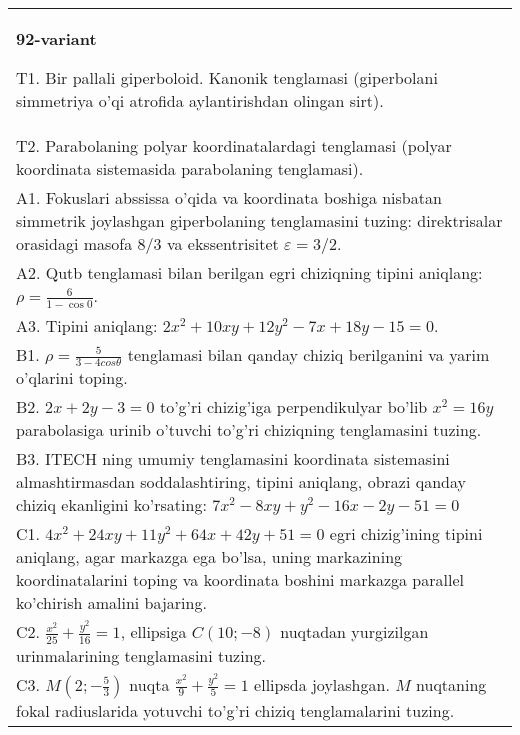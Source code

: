 \documentclass{article}
\begin{document}
\begin{tabular}{m{17cm}}
\textbf{92-variant}
\newline

T1. Bir pallali giperboloid. Kanonik tenglamasi (giperbolani simmetriya o'qi atrofida aylantirishdan olingan sirt).\\

T2. Parabolaning polyar koordinatalardagi tenglamasi (polyar koordinata sistemasida parabolaning tenglamasi).\\

A1. Fokuslari abssissa o'qida va koordinata boshiga nisbatan simmetrik joylashgan giperbolaning tenglamasini tuzing: direktrisalar orasidagi masofa $8/3$ va ekssentrisitet $\varepsilon=3/2$.\\

A2. Qutb tenglamasi bilan berilgan egri chiziqning tipini aniqlang: $\rho=\frac{6}{1-\cos 0}$.\\

A3. Tipini aniqlang: $2x^{2}+10xy+12y^{2}-7x+18y-15=0$.\\

B1. $\rho = \frac{5}{3 - 4cos\theta}$ tenglamasi bilan qanday chiziq berilganini va yarim o'qlarini toping.  \\

B2. $2x + 2y - 3 = 0$ to'g'ri chizig'iga perpendikulyar bo'lib $x^{2} = 16y$ parabolasiga urinib o'tuvchi to'g'ri chiziqning tenglamasini tuzing.  \\

B3. ITECH ning umumiy tenglamasini koordinata sistemasini almashtirmasdan soddalashtiring, tipini aniqlang, obrazi qanday chiziq ekanligini ko'rsating: $7x^{2} - 8xy + y^{2} - 16x - 2y - 51 = 0$\\

C1. $4x^{2} + 24xy + 11y^{2} + 64x + 42y + 51 = 0$ egri chizig'ining tipini aniqlang, agar markazga ega bo'lsa, uning markazining koordinatalarini toping va koordinata boshini markazga parallel ko'chirish amalini bajaring.\\

C2. $\frac{x^{2}}{25} + \frac{y^{2}}{16} = 1$, ellipsiga $C(10; - 8)$ nuqtadan yurgizilgan urinmalarining tenglamasini tuzing.  \\

C3. $M(2; - \frac{5}{3})$ nuqta $\frac{x^{2}}{9} + \frac{y^{2}}{5} = 1$ ellipsda joylashgan. $M$ nuqtaning fokal radiuslarida yotuvchi to'g'ri chiziq tenglamalarini tuzing.  \\

\end{tabular}
\vspace{1cm}
\end{document}

